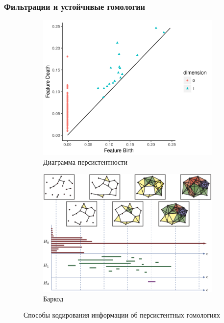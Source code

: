 \documentclass{beamer}
\begin{document}
		\begin{frame}
			\frametitle{Фильтрации и устойчивые гомологии}
			\begin{figure}
				\centering
				\begin{subfigure}{.45\textwidth}
					\centering
					\includegraphics[scale=0.5, width=\linewidth]{persist_diag.png}
					\caption{Диаграмма персистентности}
				\end{subfigure}
				\begin{subfigure}{.45\textwidth}
					\centering
					\includegraphics[width=\linewidth]{barcode.png}
					\caption{Баркод}
				\end{subfigure}
				\caption{Способы кодирования информации об персистентных гомологиях}
			\end{figure}
		\end{frame}
\end{document}

